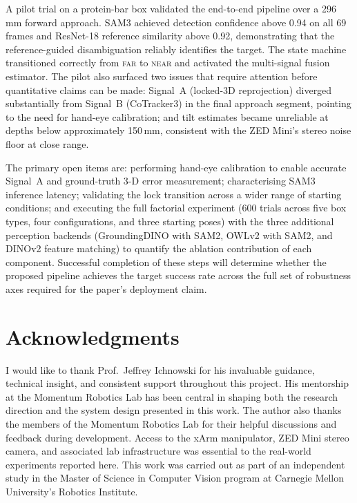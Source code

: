 \documentclass[lettersize,journal]{IEEEtran}
\begin{document}
A pilot trial on a protein-bar box validated the end-to-end pipeline over a
296\,mm forward approach.  SAM3 achieved detection confidence above 0.94 on
all 69 frames and ResNet-18 reference similarity above 0.92, demonstrating
that the reference-guided disambiguation reliably identifies the target.  The
state machine transitioned correctly from \textsc{far} to \textsc{near} and
activated the multi-signal fusion estimator.  The pilot also surfaced two
issues that require attention before quantitative claims can be made:
Signal~A (locked-3D reprojection) diverged substantially from Signal~B
(CoTracker3) in the final approach segment, pointing to the need for
hand-eye calibration; and tilt estimates became unreliable at depths below
approximately 150\,mm, consistent with the ZED Mini's stereo noise floor at
close range.

The primary open items are: performing hand-eye calibration to enable
accurate Signal~A and ground-truth 3-D error measurement; characterising
SAM3 inference latency; validating the lock transition across a wider range
of starting conditions; and executing the full factorial experiment (600
trials across five box types, four configurations, and three starting poses)
with the three additional perception backends (GroundingDINO with SAM2,
OWLv2 with SAM2, and DINOv2 feature matching) to quantify the ablation
contribution of each component.  Successful completion of these steps will
determine whether the proposed pipeline achieves the target success rate
across the full set of robustness axes required for the paper's deployment
claim.


\section*{Acknowledgments}
I would like to thank Prof.\ Jeffrey Ichnowski for his invaluable guidance,
technical insight, and consistent support throughout this project. His
mentorship at the Momentum Robotics Lab has been central in shaping both the
research direction and the system design presented in this work.
The author also thanks the members of the Momentum Robotics Lab for their
helpful discussions and feedback during development. Access to the xArm
manipulator, ZED Mini stereo camera, and associated lab infrastructure was
essential to the real-world experiments reported here.
This work was carried out as part of an independent study in the Master of
Science in Computer Vision program at Carnegie Mellon University's Robotics
Institute.
\end{document}
